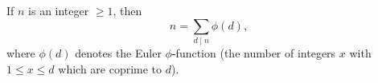 If $n$ is an integer $\geq 1$, then
$$n = \sum_{d \mid n} \phi(d),$$
where $\phi(d)$ denotes the Euler $\phi$-function (the number of integers $x$ with $1 \leq x \leq d$ which are coprime to $d$).
